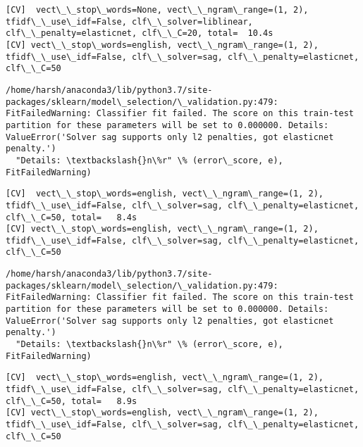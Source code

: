 \documentclass[11pt]{article}
\begin{document}
    \begin{Verbatim}[commandchars=\\\{\}]
[CV]  vect\_\_stop\_words=None, vect\_\_ngram\_range=(1, 2), tfidf\_\_use\_idf=False, clf\_\_solver=liblinear, clf\_\_penalty=elasticnet, clf\_\_C=20, total=  10.4s
[CV] vect\_\_stop\_words=english, vect\_\_ngram\_range=(1, 2), tfidf\_\_use\_idf=False, clf\_\_solver=sag, clf\_\_penalty=elasticnet, clf\_\_C=50 

    \end{Verbatim}

    \begin{Verbatim}[commandchars=\\\{\}]
/home/harsh/anaconda3/lib/python3.7/site-packages/sklearn/model\_selection/\_validation.py:479: FitFailedWarning: Classifier fit failed. The score on this train-test partition for these parameters will be set to 0.000000. Details: 
ValueError('Solver sag supports only l2 penalties, got elasticnet penalty.')
  "Details: \textbackslash{}n\%r" \% (error\_score, e), FitFailedWarning)

    \end{Verbatim}

    \begin{Verbatim}[commandchars=\\\{\}]
[CV]  vect\_\_stop\_words=english, vect\_\_ngram\_range=(1, 2), tfidf\_\_use\_idf=False, clf\_\_solver=sag, clf\_\_penalty=elasticnet, clf\_\_C=50, total=   8.4s
[CV] vect\_\_stop\_words=english, vect\_\_ngram\_range=(1, 2), tfidf\_\_use\_idf=False, clf\_\_solver=sag, clf\_\_penalty=elasticnet, clf\_\_C=50 

    \end{Verbatim}

    \begin{Verbatim}[commandchars=\\\{\}]
/home/harsh/anaconda3/lib/python3.7/site-packages/sklearn/model\_selection/\_validation.py:479: FitFailedWarning: Classifier fit failed. The score on this train-test partition for these parameters will be set to 0.000000. Details: 
ValueError('Solver sag supports only l2 penalties, got elasticnet penalty.')
  "Details: \textbackslash{}n\%r" \% (error\_score, e), FitFailedWarning)

    \end{Verbatim}

    \begin{Verbatim}[commandchars=\\\{\}]
[CV]  vect\_\_stop\_words=english, vect\_\_ngram\_range=(1, 2), tfidf\_\_use\_idf=False, clf\_\_solver=sag, clf\_\_penalty=elasticnet, clf\_\_C=50, total=   8.9s
[CV] vect\_\_stop\_words=english, vect\_\_ngram\_range=(1, 2), tfidf\_\_use\_idf=False, clf\_\_solver=sag, clf\_\_penalty=elasticnet, clf\_\_C=50 

    \end{Verbatim}
\end{document}
